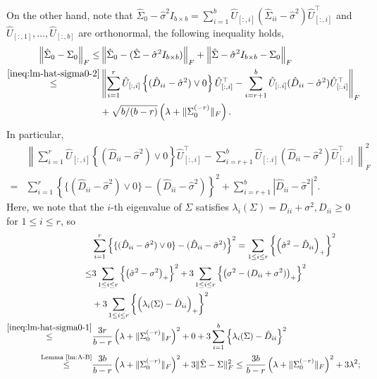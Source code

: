 \documentclass[11pt]{article}
\newcommand{\0}{{\mathbf{0}}}
\newcommand{\1}{{\mathbf{1}}}
\begin{document}
On the other hand, note that $\hat{\Sigma}_0 - \hat{\sigma}^2I_{b\times b} = \sum_{i=1}^b \hat{U}_{[:, i]} (\hat{\Sigma}_{ii} - \hat{\sigma}^2) \hat{U}_{[:, i]}^\top$ and $\hat{U}_{[:, 1]}, \ldots, \hat{U}_{[:, b]}$ are orthonormal, the following inequality holds,
\begin{equation}
\begin{split}
\left\|\hat{\Sigma}_0 - \Sigma_0\right\|_F \leq & \left\|\hat{\Sigma}_0 - (\hat{\Sigma}-\hat{\sigma}^2I_{b\times b})\right\|_F + \left\|\hat{\Sigma} - \hat{\sigma}^2I_{b\times b} - \Sigma_0\right\|_F\\
\overset{\eqref{ineq:lm-hat-sigma0-2}}{\leq} & \left\|\sum_{i=1}^r \hat{U}_{[: ,i]}\left\{(\hat{D}_{ii} - \hat{\sigma}^2)\vee 0\right\} \hat{U}_{[: ,i]}^\top - \sum_{i=r+1}^b \hat{U}_{[:. i]}(\hat{D}_{ii} - \hat{\sigma}^2)\hat{U}_{[:. i]}^\top \right\|_F \\
& + \sqrt{b/(b-r)}\left(\lambda + \|\Sigma_0^{(-r)}\|_F\right).\\
\end{split}
\end{equation}
In particular,
\begin{equation}
\begin{split}
& \left\|\sum_{i=1}^r \hat{U}_{[: ,i]}\left\{(\hat{D}_{ii} - \hat{\sigma}^2)\vee 0\right\} \hat{U}_{[: ,i]}^\top - \sum_{i=r+1}^b \hat{U}_{[:. i]}(\hat{D}_{ii} - \hat{\sigma}^2)\hat{U}_{[:. i]}^\top \right\|_F^2 \\
= & \sum_{i=1}^r\left\{\{(\hat{D}_{ii} - \hat{\sigma}^2) \vee 0\} - (\hat{D}_{ii} - \hat{\sigma}^2)\right\}^2 +  \sum_{i = r+1}^b\left|\hat{D}_{ii} - \hat{\sigma}^2\right|^2.
\end{split}
\end{equation}
Here, we note that the $i$-th eigenvalue of $\Sigma$ satisfies $\lambda_i(\Sigma) = D_{ii} + \sigma^2, D_{ii}\geq 0$ for $1\leq i \leq r$, so
\begin{equation*}
\begin{split}
& \sum_{i =1}^r\left\{\{(\hat{D}_{ii} - \hat{\sigma}^2) \vee 0\} - (\hat{D}_{ii} - \hat{\sigma}^2)\right\}^2 = \sum_{1\leq i\leq r} \left\{\left(\hat{\sigma}^2 - \hat{D}_{ii}\right)_+\right\}^2\\
\leq & 3\sum_{1\leq i\leq r}\left\{\left(\hat{\sigma}^2 - \sigma^2\right)_+\right\}^2 + 3\sum_{1\leq i\leq r}\left\{\left(\sigma^2 - (D_{ii} + \sigma^2)\right)_+\right\}^2\\
& + 3\sum_{1\leq i\leq r} \left\{\left(\lambda_i(\Sigma) - \hat{D}_{ii}\right)_+\right\}^2\\
\overset{\eqref{ineq:lm-hat-sigma0-1}}{\leq} & \frac{3r}{b-r}\left(\lambda + \|\Sigma_0^{(-r)}\|_F\right)^2 + 0 + 3\sum_{i=1}^b\left\{\lambda_i(\Sigma) - \hat{D}_{ii}\right\}^2 \\
\overset{\text{Lemma \ref{lm:A-B}}}{\leq} & \frac{3b}{b-r}\left(\lambda+\|\Sigma_0^{(-r)}\|_F\right)^2 + 3\|\hat{\Sigma} - \Sigma\|_F^2 \leq \frac{3b}{b-r}\left(\lambda + \|\Sigma_0^{(-r)}\|_F\right)^2 + 3\lambda^2;
\end{split}
\end{equation*}
\end{document}
